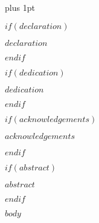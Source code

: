 \documentclass[a4paper,oneside,12pt]{theme/latex/leedsthesis}
\title{\thesistitle}
\author{\Large \thesisauthor}
\author{\thesisauthor}
\newcommand*{\bibtitle}{$bib-pdf-heading$}
\newcommand*{\bibtitle}{References}
\begin{document}

\renewcommand\baselinestretch{1.2}
\baselineskip=18pt plus 1pt




\maketitle
\setcounter{secnumdepth}{3}
\setcounter{tocdepth}{2}
\renewcommand\thesubsubsection{\thesubsection.\Alph{subsubsection}} 

\let\oldparagraph\paragraph
\renewcommand{\paragraph}[1]{\oldparagraph{#1}\mbox{}\\}

\frontmatter

$if(declaration)$
    \begin{declaration}
        $declaration$
    \end{declaration}
$endif$

$if(dedication)$
    \begin{dedication}
        \textit{$dedication$}
    \end{dedication}
$endif$

$if(acknowledgements)$
    \begin{acknowledgements}
        $acknowledgements$
    \end{acknowledgements}
$endif$

$if(abstract)$
    \begin{abstractslong}
        $abstract$
    \end{abstractslong}
$endif$

\mainmatter

$body$

\setlength{\baselineskip}{0pt}
{\renewcommand*\MakeUppercase[1]{#1}%
\printbibliography[heading=bibintoc,title={\bibtitle}]}
\end{document}
